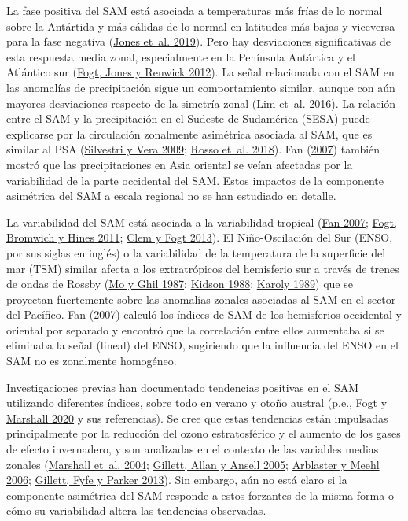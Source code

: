 \documentclass[12pt,oneside,a4paper]{reedthesis}
\begin{document}
La fase positiva del SAM está asociada a temperaturas más frías de lo normal sobre la Antártida y más cálidas de lo normal en latitudes más bajas y viceversa para la fase negativa (\protect\hyperlink{ref-jones2019}{Jones et~al. 2019}).
Pero hay desviaciones significativas de esta respuesta media zonal, especialmente en la Península Antártica y el Atlántico sur (\protect\hyperlink{ref-fogt2012}{Fogt, Jones y Renwick 2012}).
La señal relacionada con el SAM en las anomalías de precipitación sigue un comportamiento similar, aunque con aún mayores desviaciones respecto de la simetría zonal (\protect\hyperlink{ref-lim2016}{Lim et~al. 2016}).
La relación entre el SAM y la precipitación en el Sudeste de Sudamérica (SESA) puede explicarse por la circulación zonalmente asimétrica asociada al SAM, que es similar al PSA (\protect\hyperlink{ref-silvestri2009}{Silvestri y Vera 2009}; \protect\hyperlink{ref-rosso2018}{Rosso et~al. 2018}).
Fan (\protect\hyperlink{ref-fan2007}{2007}) también mostró que las precipitaciones en Asia oriental se veían afectadas por la variabilidad de la parte occidental del SAM.
Estos impactos de la componente asimétrica del SAM a escala regional no se han estudiado en detalle.

La variabilidad del SAM está asociada a la variabilidad tropical (\protect\hyperlink{ref-fan2007}{Fan 2007}; \protect\hyperlink{ref-fogt2011a}{Fogt, Bromwich y Hines 2011}; \protect\hyperlink{ref-clem2013}{Clem y Fogt 2013}).
El Niño-Oscilación del Sur (ENSO, por sus siglas en inglés) o la variabilidad de la temperatura de la superficie del mar (TSM) similar afecta a los extratrópicos del hemisferio sur a través de trenes de ondas de Rossby (\protect\hyperlink{ref-mo1987}{Mo y Ghil 1987}; \protect\hyperlink{ref-kidson1988}{Kidson 1988}; \protect\hyperlink{ref-karoly1989}{Karoly 1989}) que se proyectan fuertemente sobre las anomalías zonales asociadas al SAM en el sector del Pacífico.
Fan (\protect\hyperlink{ref-fan2007}{2007}) calculó los índices de SAM de los hemisferios occidental y oriental por separado y encontró que la correlación entre ellos aumentaba si se eliminaba la señal (lineal) del ENSO, sugiriendo que la influencia del ENSO en el SAM no es zonalmente homogéneo.

Investigaciones previas han documentado tendencias positivas en el SAM utilizando diferentes índices, sobre todo en verano y otoño austral (p.e., \protect\hyperlink{ref-fogt2020}{Fogt y Marshall 2020} y sus referencias).
Se cree que estas tendencias están impulsadas principalmente por la reducción del ozono estratosférico y el aumento de los gases de efecto invernadero, y son analizadas en el contexto de las variables medias zonales (\protect\hyperlink{ref-marshall2004}{Marshall et~al. 2004}; \protect\hyperlink{ref-gillett2005}{Gillett, Allan y Ansell 2005}; \protect\hyperlink{ref-arblaster2006}{Arblaster y Meehl 2006}; \protect\hyperlink{ref-gillett2013}{Gillett, Fyfe y Parker 2013}).
Sin embargo, aún no está claro si la componente asimétrica del SAM responde a estos forzantes de la misma forma o cómo su variabilidad altera las tendencias observadas.
\end{document}
